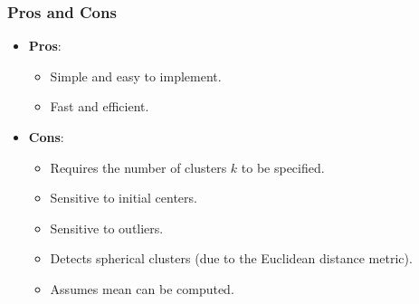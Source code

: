 \documentclass{article}
\begin{document}
\subsubsection{Pros and Cons}
\begin{itemize}
    \item \textbf{Pros}:
          \begin{itemize}
              \item Simple and easy to implement.
              \item Fast and efficient.
          \end{itemize}
    \item \textbf{Cons}:
          \begin{itemize}
              \item Requires the number of clusters \(k\) to be
                    specified.
              \item Sensitive to initial centers.
              \item Sensitive to outliers.
              \item Detects spherical clusters (due to the Euclidean
                    distance metric).
              \item Assumes mean can be computed.
          \end{itemize}
\end{itemize}
\end{document}
